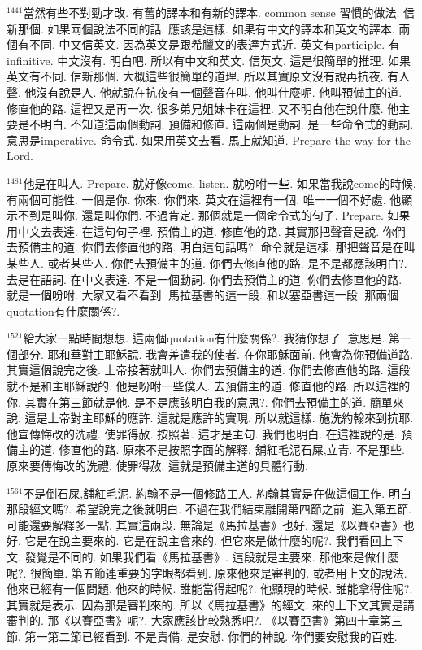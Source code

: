 \documentclass{book}
\begin{document}
$^{1441}$當然有些不對勁才改.
有舊的譯本和有新的譯本.
common sense 習慣的做法.
信新那個.
如果兩個說法不同的話.
應該是這樣.
如果有中文的譯本和英文的譯本.
兩個有不同.
中文信英文.
因為英文是跟希臘文的表達方式近.
英文有participle.
有infinitive.
中文沒有.
明白吧.
所以有中文和英文.
信英文.
這是很簡單的推理.
如果英文有不同.
信新那個.
大概這些很簡單的道理.
所以其實原文沒有說再抗夜.
有人聲.
他沒有說是人.
他就說在抗夜有一個聲音在叫.
他叫什麼呢.
他叫預備主的道.
修直他的路.
這裡又是再一次.
很多弟兄姐妹卡在這裡.
又不明白他在說什麼.
他主要是不明白.
不知道這兩個動詞.
預備和修直.
這兩個是動詞.
是一些命令式的動詞.
意思是imperative.
命令式.
如果用英文去看.
馬上就知道.
Prepare the way for the Lord.

$^{1481}$他是在叫人.
Prepare.
就好像come, listen.
就吩咐一些.
如果當我說come的時候.
有兩個可能性.
一個是你.
你來.
你們來.
英文在這裡有一個.
唯一一個不好處.
他顯示不到是叫你.
還是叫你們.
不過肯定.
那個就是一個命令式的句子.
Prepare.
如果用中文去表達.
在這句句子裡.
預備主的道.
修直他的路.
其實那把聲音是說.
你們去預備主的道.
你們去修直他的路.
明白這句話嗎?.
命令就是這樣.
那把聲音是在叫某些人.
或者某些人.
你們去預備主的道.
你們去修直他的路.
是不是都應該明白?.
去是在語詞.
在中文表達.
不是一個動詞.
你們去預備主的道.
你們去修直他的路.
就是一個吩咐.
大家又看不看到.
馬拉基書的這一段.
和以塞亞書這一段.
那兩個quotation有什麼關係?.

$^{1521}$給大家一點時間想想.
這兩個quotation有什麼關係?.
我猜你想了.
意思是.
第一個部分.
耶和華對主耶穌說.
我會差遣我的使者.
在你耶穌面前.
他會為你預備道路.
其實這個說完之後.
上帝接著就叫人.
你們去預備主的道.
你們去修直他的路.
這段就不是和主耶穌說的.
他是吩咐一些僕人.
去預備主的道.
修直他的路.
所以這裡的你.
其實在第三節就是他.
是不是應該明白我的意思?.
你們去預備主的道.
簡單來說.
這是上帝對主耶穌的應許.
這就是應許的實現.
所以就這樣.
施洗約翰來到抗耶.
他宣傳悔改的洗禮.
使罪得赦.
按照著.
這才是主句.
我們也明白.
在這裡說的是.
預備主的道.
修直他的路.
原來不是按照字面的解釋.
舖紅毛泥石屎,立青.
不是那些.
原來要傳悔改的洗禮.
使罪得赦.
這就是預備主道的具體行動.

$^{1561}$不是倒石屎,舖紅毛泥.
約翰不是一個修路工人.
約翰其實是在做這個工作.
明白那段經文嗎?.
希望說完之後就明白.
不過在我們結束離開第四節之前.
進入第五節.
可能還要解釋多一點.
其實這兩段.
無論是《馬拉基書》也好.
還是《以賽亞書》也好.
它是在說主要來的.
它是在說主會來的.
但它來是做什麼的呢?.
我們看回上下文.
發覺是不同的.
如果我們看《馬拉基書》.
這段就是主要來.
那他來是做什麼呢?.
很簡單.
第五節連重要的字眼都看到.
原來他來是審判的.
或者用上文的說法.
他來已經有一個問題.
他來的時候.
誰能當得起呢?.
他顯現的時候.
誰能拿得住呢?.
其實就是表示.
因為那是審判來的.
所以《馬拉基書》的經文.
來的上下文其實是講審判的.
那《以賽亞書》呢?.
大家應該比較熟悉吧?.
《以賽亞書》第四十章第三節.
第一第二節已經看到.
不是責備.
是安慰.
你們的神說.
你們要安慰我的百姓.
\end{document}
